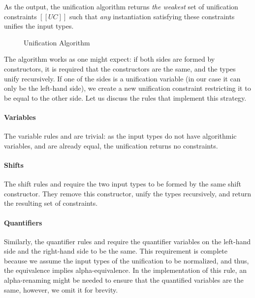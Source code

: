 As the output, the unification algorithm returns \emph{the weakest} set of
unification constraints $[[UC]]$ such that \emph{any} instantiation satisfying
these constraints unifies the input types.

\begin{figure}[t]
  \begin{minipage}[t]{0.50\textwidth}
    \ottdefnUNUnifLabeled{}
  \end{minipage}
  \hfill
  \begin{minipage}[t]{0.49\textwidth}
    \ottdefnUPUnifLabeled{}
  \end{minipage}
  \caption{Unification Algorithm}
  \label{fig:unification}
\end{figure}

The algorithm works as one might expect:
if both sides are formed by constructors, 
it is required that the constructors are the same, and the
types unify recursively. If one of the sides
is a unification variable (in our case it can only be the left-hand side),
we create a new unification constraint restricting it to be equal to the other side.
Let us discuss the rules that implement this strategy. 

\paragraph*{Variables}
  The variable rules  and 
  are trivial: as the input types do not have algorithmic variables, and are already equal, 
  the unification returns no constraints.

\paragraph*{Shifts}
  The shift rules  and 
  require the two input types to be formed by the same shift constructor. 
  They remove this constructor, unify the types recursively, and return the resulting
  set of constraints.

\paragraph*{Quantifiers} 
  Similarly, the quantifier rules  and 
  require the quantifier variables on the left-hand side and the right-hand side to be the same.
  This requirement is complete because we assume the input types of the unification 
  to be normalized, and thus, the equivalence implies alpha-equivalence. 
  In the implementation of this rule, an alpha-renaming might be needed to ensure 
  that the quantified variables are the same, however, we omit it for brevity.

